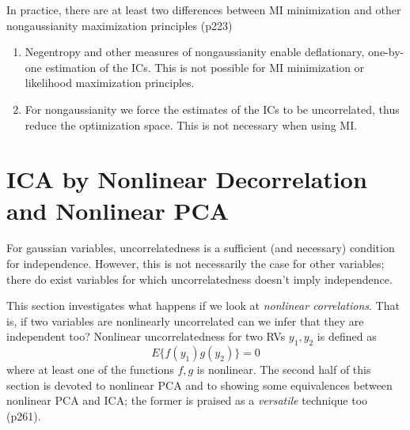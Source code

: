 \documentclass[a4paper, one	side]{book}
\begin{document}
\noindent In practice, there are at least two differences between MI minimization and other nongaussianity maximization principles (p223)
\begin{enumerate}
\item Negentropy and other measures of nongaussianity enable deflationary, \ie one-by-one estimation of the ICs. This is not possible for MI minimization or likelihood maximization principles. 
\item For nongaussianity we force the estimates of the ICs to be uncorrelated, thus reduce the optimization space. This is not necessary when using MI. 
\end{enumerate}

























\chapter{ICA by Nonlinear Decorrelation and Nonlinear PCA}

For gaussian variables, uncorrelatedness is a sufficient (and necessary) condition for independence. However, this is not necessarily the case for other variables; there do exist variables for which uncorrelatedness doesn't imply independence.

This section investigates what happens if we look at \textit{nonlinear correlations}.  That is, if two variables are nonlinearly uncorrelated can we infer that they are independent too? Nonlinear uncorrelatedness for two RVs $y_1, y_2$ is defined as 
%
\begin{equation}
E\{f(y_1)g(y_2)\} = 0
\label{eq:nonlinear_decorrelation}
\end{equation}
where at least one  of the functions $f, g$ is nonlinear. The second half of this section is devoted to nonlinear PCA and to showing some equivalences between nonlinear PCA and ICA; the former is praised as a \textit{versatile} technique too (p261).  
\end{document}
